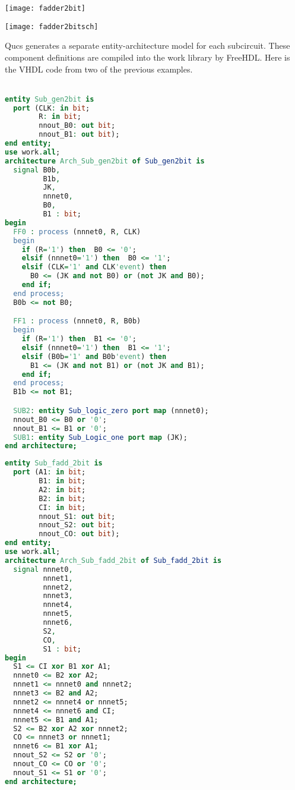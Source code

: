 
\begin{center}
  \texttt{[image: fadder2bit]}
\end{center}
\begin{center}
  \texttt{[image: fadder2bitsch]}
\end{center}


Qucs generates a separate entity-architecture model for each
subcircuit.  These component definitions are compiled into the work
library by FreeHDL.  Here is the VHDL code from two of the previous
examples.\\
\\

\begin{lstlisting}[language=VHDL]
entity Sub_gen2bit is
  port (CLK: in bit;
        R: in bit;
        nnout_B0: out bit;
        nnout_B1: out bit);
end entity;
use work.all;
architecture Arch_Sub_gen2bit of Sub_gen2bit is
  signal B0b,
         B1b,
         JK,
         nnnet0,
         B0,
         B1 : bit;
begin
  FF0 : process (nnnet0, R, CLK)
  begin
    if (R='1') then  B0 <= '0';
    elsif (nnnet0='1') then  B0 <= '1';
    elsif (CLK='1' and CLK'event) then
      B0 <= (JK and not B0) or (not JK and B0);
    end if;
  end process;
  B0b <= not B0;

  FF1 : process (nnnet0, R, B0b)
  begin
    if (R='1') then  B1 <= '0';
    elsif (nnnet0='1') then  B1 <= '1';
    elsif (B0b='1' and B0b'event) then
      B1 <= (JK and not B1) or (not JK and B1);
    end if;
  end process;
  B1b <= not B1;

  SUB2: entity Sub_logic_zero port map (nnnet0);
  nnout_B0 <= B0 or '0';
  nnout_B1 <= B1 or '0';
  SUB1: entity Sub_Logic_one port map (JK);
end architecture;
\end{lstlisting}


\begin{lstlisting}[language=VHDL]
entity Sub_fadd_2bit is
  port (A1: in bit;
        B1: in bit;
        A2: in bit;
        B2: in bit;
        CI: in bit;
        nnout_S1: out bit;
        nnout_S2: out bit;
        nnout_CO: out bit);
end entity;
use work.all;
architecture Arch_Sub_fadd_2bit of Sub_fadd_2bit is
  signal nnnet0,
         nnnet1,
         nnnet2,
         nnnet3,
         nnnet4,
         nnnet5,
         nnnet6,
         S2,
         CO,
         S1 : bit;
begin
  S1 <= CI xor B1 xor A1;
  nnnet0 <= B2 xor A2;
  nnnet1 <= nnnet0 and nnnet2;
  nnnet3 <= B2 and A2;
  nnnet2 <= nnnet4 or nnnet5;
  nnnet4 <= nnnet6 and CI;
  nnnet5 <= B1 and A1;
  S2 <= B2 xor A2 xor nnnet2;
  CO <= nnnet3 or nnnet1;
  nnnet6 <= B1 xor A1;
  nnout_S2 <= S2 or '0';
  nnout_CO <= CO or '0';
  nnout_S1 <= S1 or '0';
end architecture;
\end{lstlisting}

